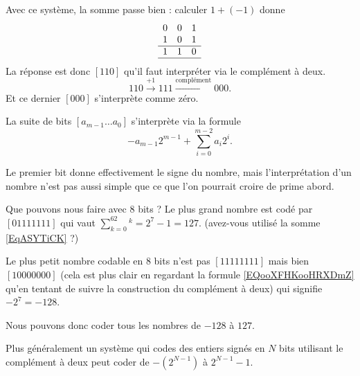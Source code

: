 Avec ce système, la somme passe bien : calculer \( 1+(-1)\) donne
\begin{equation*}
	\begin{array}[]{ccc}
		0 & 0 & 1 \\
		1 & 0 & 1 \\
		\hline
		1 & 1 & 0 \\
		\hline
	\end{array}
\end{equation*}
La réponse est donc \( [110]\) qu'il faut interpréter via le complément à deux.
\begin{equation}
	110\stackrel{+1}{\longrightarrow}111\stackrel{\text{complément}}{\longrightarrow}000.
\end{equation}
Et ce dernier \( [000]\) s'interprète comme zéro.

\begin{definition}
	La suite de bits \( [a_{m-1}\ldots a_0]\) s'interprète via la formule
	\begin{equation}        \label{EQooXFHKooHRXDmZ}
		-a_{m-1}2^{m-1}+\sum_{i=0}^{m-2}a_i2^i.
	\end{equation}
\end{definition}

Le premier bit donne effectivement le signe du nombre, mais l'interprétation d'un nombre n'est pas aussi simple que ce que l'on pourrait croire de prime abord.

\begin{example}
	Que pouvons nous faire avec \( 8\) bits ? Le plus grand nombre est codé par \( [01111111]\) qui vaut \( \sum_{k=0}^62^k=2^7-1=127\). (avez-vous utilisé la somme \eqref{EqASYTiCK} ?)

	Le plus petit nombre codable en \( 8\) bits n'est pas \( [11111111]\) mais bien \( [10000000]\) (cela est plus clair en regardant la formule \eqref{EQooXFHKooHRXDmZ} qu'en tentant de suivre la construction du complément à deux) qui signifie \( -2^7=-128\).

	Nous pouvons donc coder tous les nombres de \( -128\) à \( 127\).
\end{example}

Plus généralement un système qui codes des entiers signés en \( N\) bits utilisant le complément à deux peut coder de \( -(2^{N-1})\) à \( 2^{N-1}-1\).

